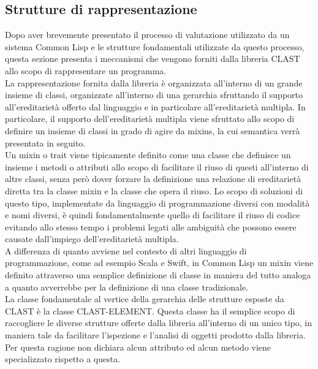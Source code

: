 \subsection{Strutture di rappresentazione}

Dopo aver brevemente presentato il processo di valutazione utilizzato da un
sistema Common Lisp e le strutture fondamentali utilizzate da questo processo,
questa sezione presenta i meccanismi che vengono forniti dalla libreria CLAST
allo scopo di rappresentare un programma.\\

La rappresentazione fornita dalla libreria è organizzata all’interno di un
grande insieme di classi, organizzate all’interno di una gerarchia sfruttando
il supporto all’ereditarietà offerto dal linguaggio e in particolare
all’ereditarietà multipla. In particolare, il supporto dell’ereditarietà
multipla viene sfruttato allo scopo di definire un insieme di classi in grado
di agire da mixins, la cui semantica verrà presentata in seguito.\\

Un mixin o trait viene tipicamente definito come una classe che definisce un
insieme i metodi o attributi allo scopo di facilitare il riuso di questi
all’interno di altre classi, senza però dover forzare la definizione una
relazione di ereditarietà diretta tra la classe mixin e la classe che opera il
riuso. Lo scopo di soluzioni di questo tipo, implementate da linguaggio di
programmazione diversi con modalità e nomi diversi, è quindi fondamentalmente
quello di facilitare il riuso di codice evitando allo stesso tempo i problemi
legati alle ambiguità che possono essere causate dall’impiego
dell’ereditarietà multipla.\\

A differenza di quanto avviene nel contesto di altri linguaggio di
programmazione, come ad esempio Scala e Swift, in Common Lisp un mixin viene
definito attraverso una semplice definizione di classe in maniera del tutto
analoga a quanto avverrebbe per la definizione di una classe tradizionale.\\

La classe fondamentale al vertice della gerarchia delle strutture esposte da
CLAST è la classe CLAST-ELEMENT. Questa classe ha il semplice scopo di
raccogliere le diverse strutture offerte dalla libreria all'interno di un
unico tipo, in maniera tale da facilitare l’ispezione e l’analisi di oggetti
prodotto dalla libreria. Per questa ragione non dichiara alcun attributo ed
alcun metodo viene specializzato rispetto a questa.\\

